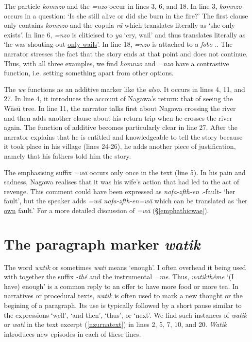 The particle \emph{komnzo} and the  \emph{=nzo} occur in lines 3, 6, and 18. In line 3, \emph{komnzo} occurs in a question: `Is she still alive or did she burn in the fire?' The first clause only contains \emph{komnzo} and the copula \emph{rä} which translates literally as `she only exists'. In line 6, \emph{=nzo} is cliticised to \emph{ya} `cry, wail' and thus translates literally as `he was shouting out \uline{only wails}'. In line 18, \emph{=nzo} is attached to a  \emph{fobo} \Dist.{\All}. The narrator stresses the fact that the story ends at that point and does not continue. Thus, with all three examples, we find \emph{komnzo} and \emph{=nzo} have a contrastive function, i.e. setting something apart from other options.

The  \emph{we} functions as an additive marker like the   \emph{also}. It occurs in lines 4, 11, and 27. In line 4, it introduces the account of Nagawa's return: that of seeing the Wäsü tree. In line 11, the narrator talks first about Nagawa crossing the river and then adds another clause about his return trip when he crosses the river again. The function of additive  becomes particularly clear in line 27. After the narrator explains that he is entitled and knowledgeable to tell the story because it took place in his village (lines 24-26), he adds another piece of justification, namely that his fathers told him the story.

\largerpage
The emphasising suffix \emph{=wä} occurs only once in the text (line 5). In his pain and sadness, Nagawa realises that it was his wife's action that had led to the act of revenge. This comment could have been expressed as \emph{nafa-zfth-en} \Third.\Poss-fault-{\Loc} `her fault', but the speaker adds \emph{=wä} \emph{nafa-zfth-en=wä} which can be translated as `her \uline{own} fault.' For a more detailed discussion of \emph{=wä} ({\S}\ref{emphathicwae}).

\section{The paragraph marker \emph{watik}} \label{watik}

The word \emph{watik} or sometimes \emph{wati} means `enough'. I often overhead it being used with together the  suffix \emph{-thé} and the instrumental \emph{=me}. Thus, \emph{watikthéme} `(I have) enough' is a common reply to an offer to have more food or more tea. In narratives or procedural texts, \emph{watik} is often used to mark a new thought or the begining of a paragraph. Its use is typically followed by a short pause similar to the  expressions `well', `and then', `thus', or `next'. We find such instances of \emph{watik} or \emph{wati} in the text excerpt (\ref{nzurnatext}) in lines 2, 5, 7, 10, and 20. \emph{Watik} introduces new episodes in each of these lines.

